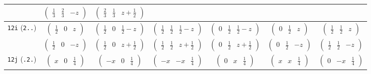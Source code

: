 \documentclass[fleqn,9pt,landscape]{jsarticle}
\begin{document}
\begin{center}
\begin{longtable}{ccccccc}
& $ \begin{pmatrix} \frac{1}{3} & \frac{2}{3} & - z \end{pmatrix} $ & $ \begin{pmatrix} \frac{2}{3} & \frac{1}{3} & z + \frac{1}{2} \end{pmatrix} $ & $  $ & $  $ & $  $ & $  $ \\ \hline
{\tt 12i} ({\tt 2..}) & $ \begin{pmatrix} \frac{1}{2} & 0 & z \end{pmatrix} $ & $ \begin{pmatrix} \frac{1}{2} & 0 & \frac{1}{2} - z \end{pmatrix} $ & $ \begin{pmatrix} \frac{1}{2} & \frac{1}{2} & \frac{1}{2} - z \end{pmatrix} $ & $ \begin{pmatrix} 0 & \frac{1}{2} & \frac{1}{2} - z \end{pmatrix} $ & $ \begin{pmatrix} 0 & \frac{1}{2} & z \end{pmatrix} $ & $ \begin{pmatrix} \frac{1}{2} & \frac{1}{2} & z \end{pmatrix} $ \\
& $ \begin{pmatrix} \frac{1}{2} & 0 & - z \end{pmatrix} $ & $ \begin{pmatrix} \frac{1}{2} & 0 & z + \frac{1}{2} \end{pmatrix} $ & $ \begin{pmatrix} \frac{1}{2} & \frac{1}{2} & z + \frac{1}{2} \end{pmatrix} $ & $ \begin{pmatrix} 0 & \frac{1}{2} & z + \frac{1}{2} \end{pmatrix} $ & $ \begin{pmatrix} 0 & \frac{1}{2} & - z \end{pmatrix} $ & $ \begin{pmatrix} \frac{1}{2} & \frac{1}{2} & - z \end{pmatrix} $ \\ \hline
{\tt 12j} ({\tt .2.}) & $ \begin{pmatrix} x & 0 & \frac{1}{4} \end{pmatrix} $ & $ \begin{pmatrix} - x & 0 & \frac{1}{4} \end{pmatrix} $ & $ \begin{pmatrix} - x & - x & \frac{1}{4} \end{pmatrix} $ & $ \begin{pmatrix} 0 & x & \frac{1}{4} \end{pmatrix} $ & $ \begin{pmatrix} x & x & \frac{1}{4} \end{pmatrix} $ & $ \begin{pmatrix} 0 & - x & \frac{1}{4} \end{pmatrix} $ \\

\end{longtable}
\end{center}
\end{document}
